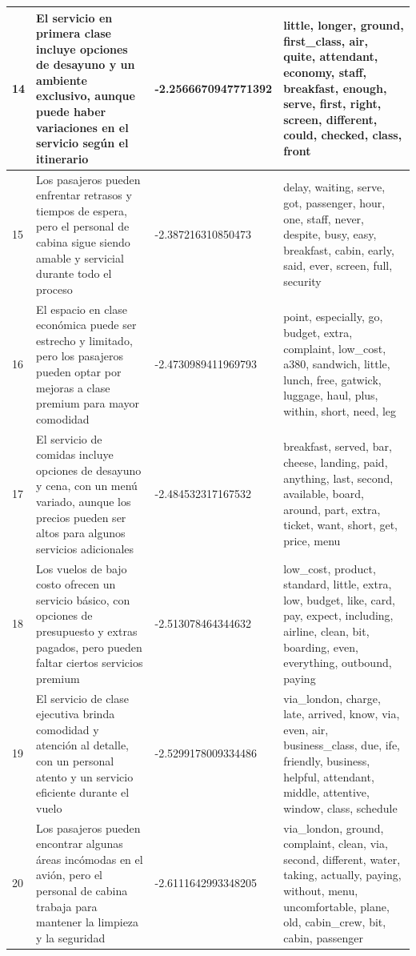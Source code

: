 \documentclass{report}
\begin{document}
{{\begin{longtable}{|p{1cm}|p{4cm}|p{4cm}|p{6cm}|}
                    \hline
                    14 & El servicio en primera clase incluye opciones de desayuno y un ambiente exclusivo, aunque puede haber variaciones en el servicio según el itinerario & -2.2566670947771392 & little, longer, ground, first\_class, air, quite, attendant, economy, staff, breakfast, enough, serve, first, right, screen, different, could, checked, class, front \\
                    \hline
                    15 & Los pasajeros pueden enfrentar retrasos y tiempos de espera, pero el personal de cabina sigue siendo amable y servicial durante todo el proceso & -2.387216310850473 & delay, waiting, serve, got, passenger, hour, one, staff, never, despite, busy, easy, breakfast, cabin, early, said, ever, screen, full, security \\
                    \hline
                    16 & El espacio en clase económica puede ser estrecho y limitado, pero los pasajeros pueden optar por mejoras a clase premium para mayor comodidad & -2.4730989411969793 & point, especially, go, budget, extra, complaint, low\_cost, a380, sandwich, little, lunch, free, gatwick, luggage, haul, plus, within, short, need, leg \\
                    \hline
                    17 & El servicio de comidas incluye opciones de desayuno y cena, con un menú variado, aunque los precios pueden ser altos para algunos servicios adicionales & -2.484532317167532 & breakfast, served, bar, cheese, landing, paid, anything, last, second, available, board, around, part, extra, ticket, want, short, get, price, menu \\
                    \hline
                    18 & Los vuelos de bajo costo ofrecen un servicio básico, con opciones de presupuesto y extras pagados, pero pueden faltar ciertos servicios premium & -2.513078464344632 & low\_cost, product, standard, little, extra, low, budget, like, card, pay, expect, including, airline, clean, bit, boarding, even, everything, outbound, paying \\
                    \hline
                    19 & El servicio de clase ejecutiva brinda comodidad y atención al detalle, con un personal atento y un servicio eficiente durante el vuelo & -2.5299178009334486 & via\_london, charge, late, arrived, know, via, even, air, business\_class, due, ife, friendly, business, helpful, attendant, middle, attentive, window, class, schedule \\
                    \hline
                    20 & Los pasajeros pueden encontrar algunas áreas incómodas en el avión, pero el personal de cabina trabaja para mantener la limpieza y la seguridad & -2.6111642993348205 & via\_london, ground, complaint, clean, via, second, different, water, taking, actually, paying, without, menu, uncomfortable, plane, old, cabin\_crew, bit, cabin, passenger \\

\end{longtable}}}
\end{document}

